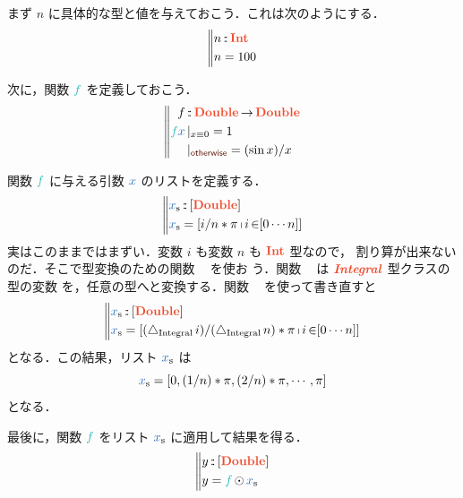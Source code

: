 \documentclass[a5paper,twoside,fleqn,draft]{jsbook}
\def\keywordColor{Sepia}
\def\varColor{NavyBlue}
\def\funcColor{BlueGreen}
\def\typeColor{RedOrange}
\newcommand{\mBrace}{\Vert}
\newcommand{\mKeyword}[1]{\textcolor{\keywordColor}{\mathsf{#1}}}
\newcommand{\mOtherwiseKeyword}{\mKeyword{otherwise}}
\DeclareMathOperator{\mOtherwise}{\mOtherwiseKeyword}
\newcommand{\mVar}[1]{\textcolor{\varColor}{#1}}
\newcommand{\mXVar}{\mVar{x}}
\newcommand{\mUpCast}{\bigtriangleup}
\DeclareMathOperator{\mFromIntegral}{\mUpCast_\text{Integral}}
\newcommand{\mFunc}[1]{\textcolor{\funcColor}{#1}}
\newcommand{\mFFunc}{{\mFunc{f}}}
\DeclareMathOperator{\mFrom}{\in}
\DeclareMathOperator{\mFuncArrow}{\rightarrow}
\DeclareMathOperator{\mIn}{{:\!:}}
\DeclareMathOperator{\mMapList}{\odot}
\newcommand{\mType}[1]{\textcolor{\typeColor}{\mathbf{#1}}}
\newcommand{\mDoubleType}{\mType{Double}}
\newcommand{\mIntType}{\mType{Int}}
\newcommand{\mTypeClass}[1]{\textcolor{\typeColor}{\textbf{\textit{#1}}}}
\newcommand{\mIntegralTypeClass}{\mTypeClass{Integral}}
\newcommand{\mList}[1]{\mVar{#1}_\mathrm{s}}
\newcommand{\mGuard}[1]{\mathop{\mid_{#1}}}
\DeclareMathOperator{\mListComp}{\shortmid}
\newcommand{\mProjEXP}[2]{#1\mFuncArrow#2} %
\begin{document}
まず $n$ に具体的な型と値を与えておこう．これは次のようにする．
\begin{equation}
\left\mBrace
\begin{aligned}
n&\mIn\mIntType\\
n&=100
\end{aligned}
\right.
\end{equation}

次に，関数 $\mFFunc$ を定義しておこう．
\begin{equation}
\left\mBrace
\begin{aligned}
f&\mIn\mProjEXP{\mDoubleType}{\mDoubleType}\\
\mFFunc\mXVar&\mGuard{x\equiv0}=1\\
&\mGuard{\mOtherwise}=(\sin x)/x
\end{aligned}
\right.
\end{equation}

関数 $\mFFunc$ に与える引数 $\mXVar$ のリストを定義する．
\begin{equation*}
  \left\mBrace
  \begin{aligned}
    \mList{x}
    &\mIn{}[\mDoubleType]\\
    \mList{x}
    &=[i/n*\pi\mListComp i\mFrom[0\dotsb n]]
  \end{aligned}
  \right.
\end{equation*}
実はこのままではまずい．変数 $i$ も変数 $n$ も $\mIntType$ 型なので，
割り算が出来ないのだ．そこで型変換のための関数 $\mFromIntegral$ を使お
う．関数 $\mFromIntegral$ は $\mIntegralTypeClass$ 型クラスの型の変数
を，任意の型へと変換する．関数 $\mFromIntegral$ を使って書き直すと
\begin{equation}
  \left\mBrace
  \begin{aligned}
    \mList{x}
    &\mIn{}[\mDoubleType]\\
    \mList{x}
    &=[(\mFromIntegral i)/(\mFromIntegral n)*\pi\mListComp i\mFrom[0\dotsb n]]
  \end{aligned}
  \right.
\end{equation}
となる．この結果，リスト $\mList{x}$ は
\begin{equation}
  \mList{x}
  =[0,(1/n)*\pi,(2/n)*\pi,\dotsb,\pi]
\end{equation}
となる．

最後に，関数 $\mFFunc$ をリスト $\mList{x}$ に適用して結果を得る．
\begin{equation}
  \left\mBrace
  \begin{aligned}
    y
    &\mIn{}[\mDoubleType]\\
    y
    &=\mFFunc\mMapList\mList{x}
  \end{aligned}
  \right.
\end{equation}
\end{document}
